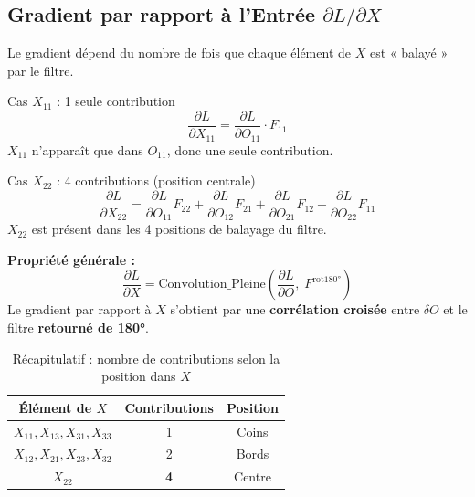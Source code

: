 \documentclass[12pt, a4paper]{article}
\begin{document}
\subsection{Gradient par rapport à l'Entrée $\partial L / \partial X$}

Le gradient dépend du nombre de fois que chaque élément de $X$ est « balayé »
par le filtre.

\begin{stepbox}{Cas $X_{11}$ : 1 seule contribution}
\begin{equation}
    \frac{\partial L}{\partial X_{11}}
    = \frac{\partial L}{\partial O_{11}} \cdot F_{11}
\end{equation}
$X_{11}$ n'apparaît que dans $O_{11}$, donc une seule contribution.
\end{stepbox}

\vspace{0.4cm}

\begin{stepbox}{Cas $X_{22}$ : 4 contributions (position centrale)}
\begin{equation}
    \frac{\partial L}{\partial X_{22}}
    = \frac{\partial L}{\partial O_{11}} F_{22}
    + \frac{\partial L}{\partial O_{12}} F_{21}
    + \frac{\partial L}{\partial O_{21}} F_{12}
    + \frac{\partial L}{\partial O_{22}} F_{11}
    \label{eq:grad_x22}
\end{equation}
$X_{22}$ est présent dans les 4 positions de balayage du filtre.
\end{stepbox}

\begin{propbox}
\textbf{Propriété générale :}
\[
    \frac{\partial L}{\partial X}
    = \text{Convolution\_Pleine}\!\left(\frac{\partial L}{\partial O},\;F^{\text{rot180°}}\right)
\]
Le gradient par rapport à $X$ s'obtient par une \textbf{corrélation croisée}
entre $\delta O$ et le filtre \textbf{retourné de 180°}.
\end{propbox}

\begin{table}[H]
    \centering
    \caption{Récapitulatif : nombre de contributions selon la position dans $X$}
    \label{tab:contrib}
    \renewcommand{\arraystretch}{1.5}
    \begin{tabular}{ccc}
        \toprule
        \rowcolor{espblue!15}
        \textbf{Élément de $X$} & \textbf{Contributions} & \textbf{Position} \\
        \midrule
        $X_{11}, X_{13}, X_{31}, X_{33}$ & 1 & Coins \\
        $X_{12}, X_{21}, X_{23}, X_{32}$ & 2 & Bords \\
        $X_{22}$                          & \cellcolor{codegreen!20}\textbf{4} & Centre \\
        \bottomrule
    \end{tabular}
\end{table}
\end{document}
